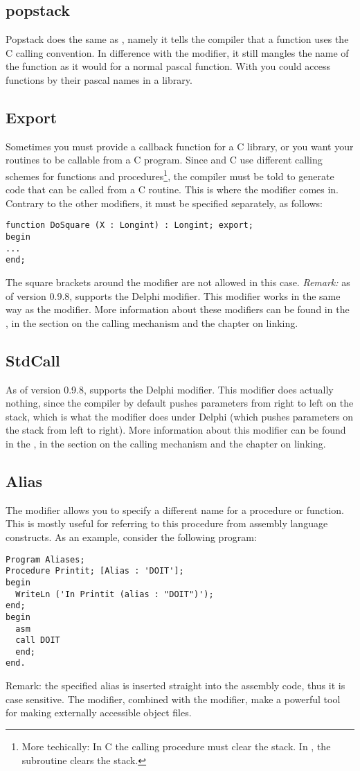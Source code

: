 \documentclass{report}
\begin{document}
\subsection{popstack}
\label{se:popstack}
Popstack does the same as , namely it tells the \fpc compiler
that a function uses the C calling convention. In difference with the
 modifier, it still mangles the name of the function as it would
for a normal pascal function.
With  you could access functions by their pascal names in a
library.
\subsection{Export}
Sometimes you must provide a callback function for a C library, or you want
your routines to be callable from a C program. Since \fpc and C use
different calling schemes for functions and procedures\footnote{More
techically: In C the calling procedure must clear the stack. In \fpc, the
subroutine clears the stack.}, the compiler must be told to generate code
that can be called from a C routine. This is where the  modifier
comes in. Contrary to the other modifiers, it must be specified separately,
as follows:
\begin{verbatim}
function DoSquare (X : Longint) : Longint; export;
begin
...
end;
\end{verbatim}
The square brackets around the modifier are not allowed in this case.
{\em Remark:}
as of version 0.9.8, \fpc supports the Delphi  modifier.
This modifier works in the same way as the  modifier.
More information about these modifiers can be found in the \progref, in the
section on the calling mechanism and the chapter on linking.
\subsection{StdCall}
As of version 0.9.8, \fpc supports the Delphi  modifier.
This modifier does actually nothing, since the \fpc compiler by default
pushes parameters from right to left on the stack, which is what the
modifier does under Delphi (which pushes parameters on the stack from left to
right).
More information about this modifier can be found in the \progref, in the
section on the calling mechanism and the chapter on linking.
\subsection{Alias}
The  modifier allows you to specify a different name for a
procedure or function. This is mostly useful for referring to this procedure
from assembly language constructs. As an example, consider the following
program:
\begin{verbatim}
Program Aliases;
Procedure Printit; [Alias : 'DOIT'];
begin
  WriteLn ('In Printit (alias : "DOIT")');
end;
begin
  asm
  call DOIT
  end;
end.
\end{verbatim}
{\rm Remark:} the specified alias is inserted straight into the assembly
code, thus it is case sensitive.
The  modifier, combined with the  modifier, make a
powerful tool for making externally accessible object files.
\end{document}
